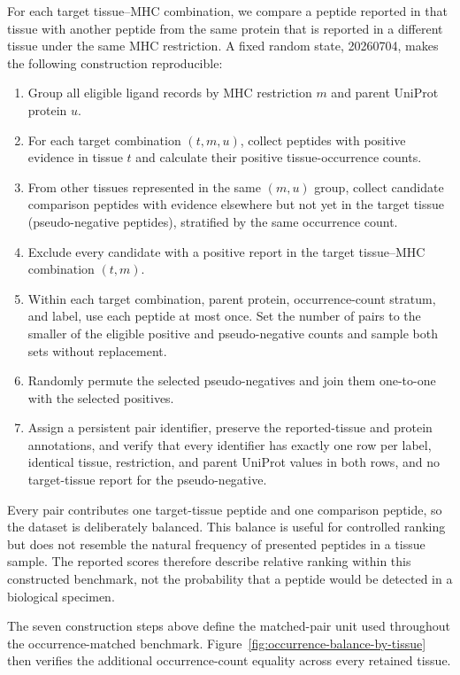 For each target tissue--MHC combination, we compare a peptide reported in that tissue with another peptide from the same protein that is reported in a different tissue under the same MHC restriction. A fixed random state, 20260704, makes the following construction reproducible:

\begin{enumerate}
    \item Group all eligible ligand records by MHC restriction \(m\) and parent UniProt protein \(u\).
    \item For each target combination \((t,m,u)\), collect peptides with positive evidence in tissue \(t\) and calculate their positive tissue-occurrence counts.
    \item From other tissues represented in the same \((m,u)\) group, collect candidate comparison peptides with evidence elsewhere but not yet in the target tissue (pseudo-negative peptides), stratified by the same occurrence count.
    \item Exclude every candidate with a positive report in the target tissue--MHC combination \((t,m)\).
    \item Within each target combination, parent protein, occurrence-count stratum, and label, use each peptide at most once. Set the number of pairs to the smaller of the eligible positive and pseudo-negative counts and sample both sets without replacement.
    \item Randomly permute the selected pseudo-negatives and join them one-to-one with the selected positives.
    \item Assign a persistent pair identifier, preserve the reported-tissue and protein annotations, and verify that every identifier has exactly one row per label, identical tissue, restriction, and parent UniProt values in both rows, and no target-tissue report for the pseudo-negative.
\end{enumerate}

Every pair contributes one target-tissue peptide and one comparison peptide, so the dataset is deliberately balanced. This balance is useful for controlled ranking but does not resemble the natural frequency of presented peptides in a tissue sample. The reported scores therefore describe relative ranking within this constructed benchmark, not the probability that a peptide would be detected in a biological specimen.

The seven construction steps above define the matched-pair unit used throughout the occurrence-matched benchmark. Figure~\ref{fig:occurrence-balance-by-tissue} then verifies the additional occurrence-count equality across every retained tissue.

